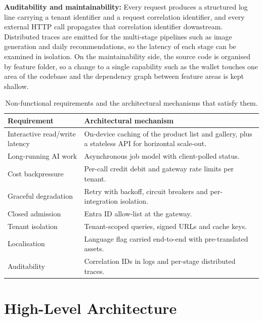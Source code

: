 \textbf{Auditability and maintainability:} Every request produces a structured log line carrying a tenant identifier and a request correlation identifier, and every external HTTP call propagates that correlation identifier downstream. Distributed traces are emitted for the multi-stage pipelines such as image generation and daily recommendations, so the latency of each stage can be examined in isolation. On the maintainability side, the source code is organised by feature folder, so a change to a single capability such as the wallet touches one area of the codebase and the dependency graph between feature areas is kept shallow.

\begin{table}[ht]
\centering
\caption{Non-functional requirements and the architectural mechanisms that satisfy them.}
\label{tab:nonfunctional-requirements}
\small
\renewcommand{\arraystretch}{1.3}
\begin{tabularx}{\textwidth}{|>{\raggedright\arraybackslash}p{4.0cm}|Y|}
\hline
\textbf{Requirement} & \textbf{Architectural mechanism} \\
\hline
Interactive read/write latency & On-device caching of the product list and gallery, plus a stateless API for horizontal scale-out. \\
\hline
Long-running AI work & Asynchronous job model with client-polled status. \\
\hline
Cost backpressure & Per-call credit debit and gateway rate limits per tenant. \\
\hline
Graceful degradation & Retry with backoff, circuit breakers and per-integration isolation. \\
\hline
Closed admission & Entra ID allow-list at the gateway. \\
\hline
Tenant isolation & Tenant-scoped queries, signed URLs and cache keys. \\
\hline
Localisation & Language flag carried end-to-end with pre-translated assets. \\
\hline
Auditability & Correlation IDs in logs and per-stage distributed traces. \\
\hline
\end{tabularx}
\end{table}

\section{High-Level Architecture}
\label{sec:high-level-architecture}

